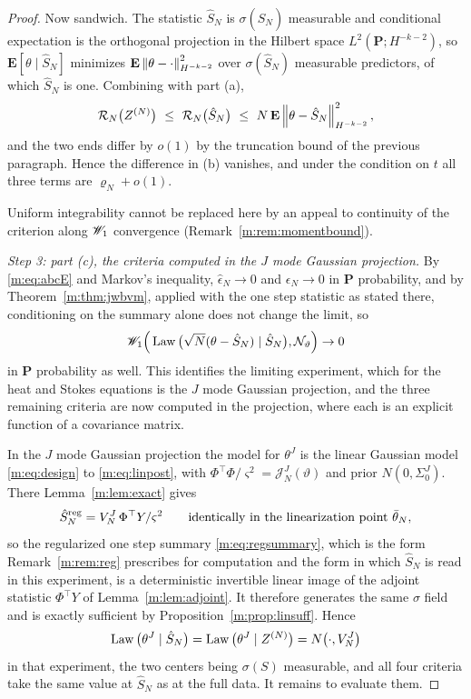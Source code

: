 \begin{proof}
Now sandwich. The statistic $\hat S_N$ is $\sigma(\hat S_N)$ measurable and conditional expectation is the orthogonal projection in the Hilbert space $L^2(\mathbf{P};H^{-k-2})$, so $\mathbf{E}[\theta\mid\hat S_N]$ minimizes $\mathbf{E}\left\|\theta-\cdot\right\|^2_{H^{-k-2}}$ over $\sigma(\hat S_N)$ measurable predictors, of which $\hat S_N$ is one. Combining with part (a),
\[
\mathcal R_N\big(Z^{(N)}\big)\ \le\ \mathcal R_N\big(\hat S_N\big)\ \le\ N\,\mathbf{E}\norm{\theta-\hat S_N}^2_{H^{-k-2}} ,
\]
and the two ends differ by $o(1)$ by the truncation bound of the previous paragraph. Hence the difference in (b) vanishes, and under the condition on $t$ all three terms are $\varrho_N+o(1)$.

Uniform integrability cannot be replaced here by an appeal to continuity of the criterion along $\mathscr{W}_1$ convergence (Remark~\ref{m:rem:momentbound}).

\emph{Step 3: part (c), the criteria computed in the $J$ mode Gaussian projection.} By \eqref{m:eq:abcE} and Markov's inequality, $\hat\epsilon_N\to0$ and $\epsilon_N\to0$ in $\mathbf{P}$ probability, and by Theorem~\ref{m:thm:jwbvm}, applied with the one step statistic as stated there, conditioning on the summary alone does not change the limit, so
\[
\mathscr{W}_1\Big(\operatorname{Law}\big(\sqrt N(\theta-\hat S_N)\mid\hat S_N\big),\mathcal{N}_\vartheta\Big)\to0
\]
in $\mathbf{P}$ probability as well. This identifies the limiting experiment, which for the heat and Stokes equations is the $J$ mode Gaussian projection, and the three remaining criteria are now computed in the projection, where each is an explicit function of a covariance matrix.

In the $J$ mode Gaussian projection the model for $\theta^J$ is the linear Gaussian model \eqref{m:eq:design} to \eqref{m:eq:linpost}, with $\Phi^\top\Phi/\varsigma^2=\mathcal J^J_N(\vartheta)$ and prior $N(0,\Sigma^J_0)$. There Lemma~\ref{m:lem:exact} gives
\[
\hat S^{\rm reg}_N=V^J_N\,\Phi^\top Y/\varsigma^2\qquad\text{identically in the linearization point }\bar\theta_N ,
\]
so the regularized one step summary \eqref{m:eq:regsummary}, which is the form Remark~\ref{m:rem:reg} prescribes for computation and the form in which $\hat S_N$ is read in this experiment, is a deterministic invertible linear image of the adjoint statistic $\Phi^\top Y$ of Lemma~\ref{m:lem:adjoint}. It therefore generates the same $\sigma$ field and is exactly sufficient by Proposition~\ref{m:prop:linsuff}. Hence
\[
\operatorname{Law}\big(\theta^J\mid\hat S_N\big)=\operatorname{Law}\big(\theta^J\mid Z^{(N)}\big)=N\big(\cdot,V^J_N\big)
\]
in that experiment, the two centers being $\sigma(S)$ measurable, and all four criteria take the same value at $\hat S_N$ as at the full data. It remains to evaluate them.


\end{proof}
